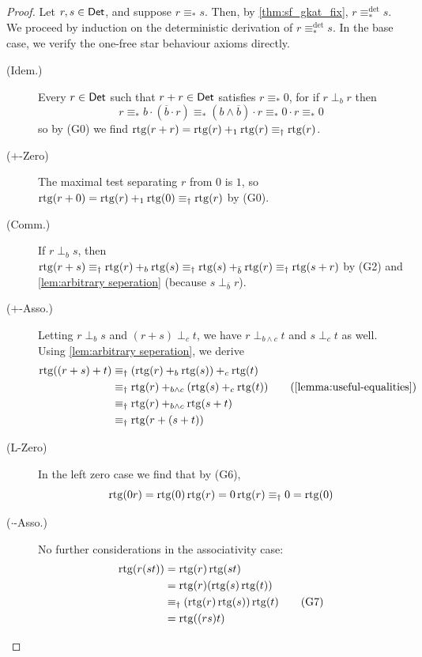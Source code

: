 \documentclass[orivec,envcountsect,envcountsame]{llncs}
\begin{document}
\lemconservativity*

\begin{proof}
	Let \(r, s \in \mathsf{Det}\), and suppose \(r \equiv_* s\).
	Then, by \cref{thm:sf_gkat_fix}, \(r \equiv_*^{\det} s\).
	We proceed by induction on the deterministic derivation of \(r \equiv_*^{\det} s\).
	In the base case, we verify the one-free star behaviour axioms directly.
	\begin{description}
		\item[(Idem.)] Every \(r \in \mathsf{Det}\) such that \(r + r \in \mathsf{Det}\) satisfies \(r \equiv_* 0\), for if $r \perp_b r$ then
        \[
            r
                \equiv_* b \cdot (\overline{b} \cdot r)
                \equiv_* (b \wedge \overline{b}) \cdot r
                \equiv_* 0 \cdot r
                \equiv_* 0
        \]
        so by (G0) we find
		\(\operatorname{rtg}(r + r)
		= \operatorname{rtg}(r) +_1 \operatorname{rtg}(r)
		\equiv_\dagger \operatorname{rtg}(r)\).

		\item[(\(+\)-Zero)] The maximal test separating \(r\) from \(0\) is \(1\), so \(\operatorname{rtg}(r + 0) = \operatorname{rtg}(r) +_1 \operatorname{rtg}(0) \equiv_\dagger \operatorname{rtg}(r)\) by (G0).

		\item[(Comm.)] If \(r \perp_b s\), then
		\(
		\operatorname{rtg}(r + s)
		\equiv_\dagger \operatorname{rtg}(r) +_b \operatorname{rtg}(s)
		\equiv_\dagger \operatorname{rtg}(s) +_{\bar b} \operatorname{rtg}(r)
		\equiv_\dagger \operatorname{rtg}(s + r)
		\)
		by (\textsf{G2}) and \cref{lem:arbitrary seperation} (because \(s \perp_{\bar b} r\)).

		\item[(\(+\)-Asso.)] Letting \(r \perp_b s\) and \((r + s) \perp_c t\), we have \(r \perp_{b\wedge c} t\) and \(s \perp_c t\) as well.
		Using \cref{lem:arbitrary seperation}, we derive
		\begin{align*}
			\rtg((r + s) + t)
			&\equiv_\dagger (\rtg(r) +_b \rtg(s)) +_c \rtg(t) \\
			&\equiv_\dagger \rtg(r) +_{b\wedge c} (\rtg(s) +_c \rtg(t))  \tag{\cref{lemma:useful-equalities}}\\
			&\equiv_\dagger \rtg(r) +_{b\wedge c} \rtg(s + t) \\
			&\equiv_\dagger \rtg(r + (s + t))
		\end{align*}

		\item[(L-Zero)] In the left zero case we find that by (\textsf{G6}),
		\[ \operatorname{rtg}(0r) = \operatorname{rtg}(0)\operatorname{rtg}(r) = 0\operatorname{rtg}(r) \equiv_\dagger 0 = \operatorname{rtg}(0)\]

		\item[(\(\cdot\)-Asso.)] No further considerations in the associativity case:
		\begin{align*}
			\operatorname{rtg}(r(st))
			&= \operatorname{rtg}(r)\operatorname{rtg}(st)   \\
			&= \operatorname{rtg}(r)(\operatorname{rtg}(s)\operatorname{rtg}(t))   \\
			&\equiv_\dagger (\operatorname{rtg}(r)\operatorname{rtg}(s))\operatorname{rtg}(t) \tag{G7}\\
			&= \operatorname{rtg}((rs)t)
		\end{align*}


\end{description}
\end{proof}
\end{document}
